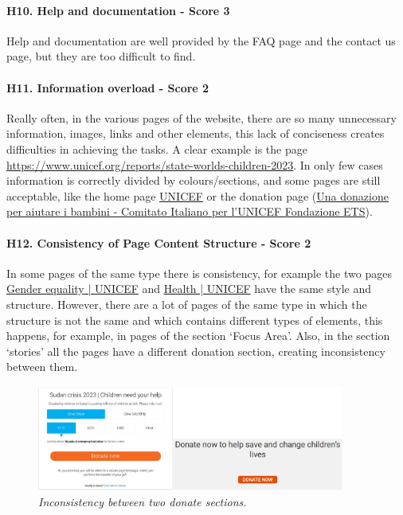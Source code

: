 \newline
\newline \paragraph{H10. Help and documentation - Score 3}	Help and documentation are well provided by the FAQ page and the contact us page, but they are too difficult to find.
\newline
\newline \paragraph{H11. Information overload - Score 2}	Really often, in the various pages of the website, there are so many unnecessary information, images, links and other elements, this lack of conciseness creates difficulties in achieving the tasks. A clear example is the page \href{https://www.unicef.org/reports/state-worlds-children-2023}{https://www.unicef.org/reports/state-worlds-children-2023}.
\newline In only few cases information is correctly divided by colours/sections, and some pages are still acceptable, like the home page \href{https://www.unicef.org/}{UNICEF} or the donation page (\href{https://donazioni.unicef.it}{Una donazione per aiutare i bambini - Comitato Italiano per l'UNICEF Fondazione ETS}).
\newline
\newline \paragraph{H12. Consistency of Page Content Structure - Score 2}	In some pages of the same type there is consistency, for example the two pages \href{https://www.unicef.org/gender-equality}{Gender equality | UNICEF} and \href{https://www.unicef.org/health}{Health | UNICEF} have the same style and structure.
\newline However, there are a lot of pages of the same type in which the structure is not the same and which contains different types of elements, this happens, for example, in pages of the section ‘Focus Area’.
\newline Also, in the section ‘stories’ all the pages have a different donation section, creating inconsistency between them.
\begin{figure}[!h]
	\begin{center}
		\includegraphics[width=0.9\textwidth]{FinalScores16.jpg}
		\captionsetup{font=small}
		\caption{\textit{Inconsistency between two donate sections.}}
	\end{center}
\end{figure}
